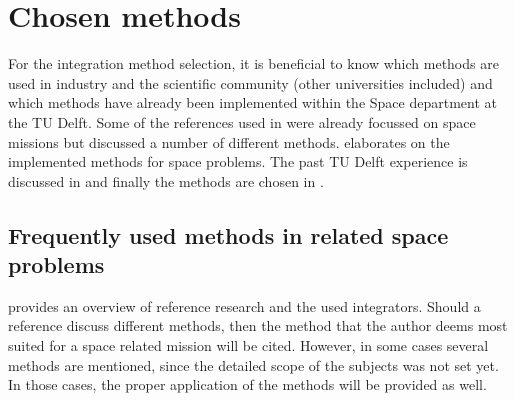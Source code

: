 \section{Chosen methods}
\label{sec:intchosmeth}
For the integration method selection, it is beneficial to know which methods are used in industry and the scientific community (other universities included) and which methods have already been implemented within the Space department at the TU Delft. Some of the references used in  were already focussed on space missions but discussed a number of different methods.  elaborates on the implemented methods for space problems. The past TU Delft experience is discussed in  and finally the methods are chosen in . 
%

\subsection{Frequently used methods in related space problems}
\label{subsec:intfreqmeth}
 provides an overview of reference research and the used integrators. Should a reference discuss different methods, then the method that the author deems most suited for a space related mission will be cited. However, in some cases several methods are mentioned, since the detailed scope of the subjects was not set yet. In those cases, the proper application of the methods will be provided as well. 


